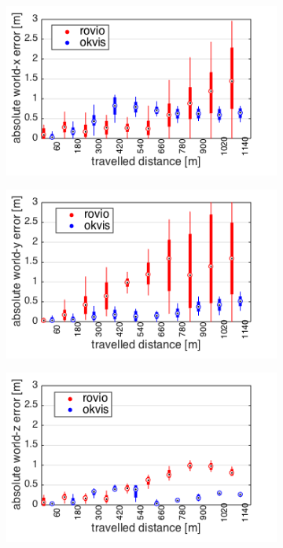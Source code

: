 \begin{figure}[h]
\begin{subfigure}[b]{0.48\textwidth}
    \caption{}
  \end{subfigure}
  \hfill
  \begin{subfigure}[b]{0.48\textwidth}
    \includegraphics[width=\textwidth]{images/ijrr/ate_x.png}
    \caption{}
  \end{subfigure}
  \begin{subfigure}[b]{0.48\textwidth}
    \includegraphics[width=\textwidth]{images/ijrr/ate_y.png}
    \caption{}
  \end{subfigure}
  \hfill
  \begin{subfigure}[b]{0.48\textwidth}
    \includegraphics[width=\textwidth]{images/ijrr/ate_z.png}

\end{subfigure}
\end{figure}

